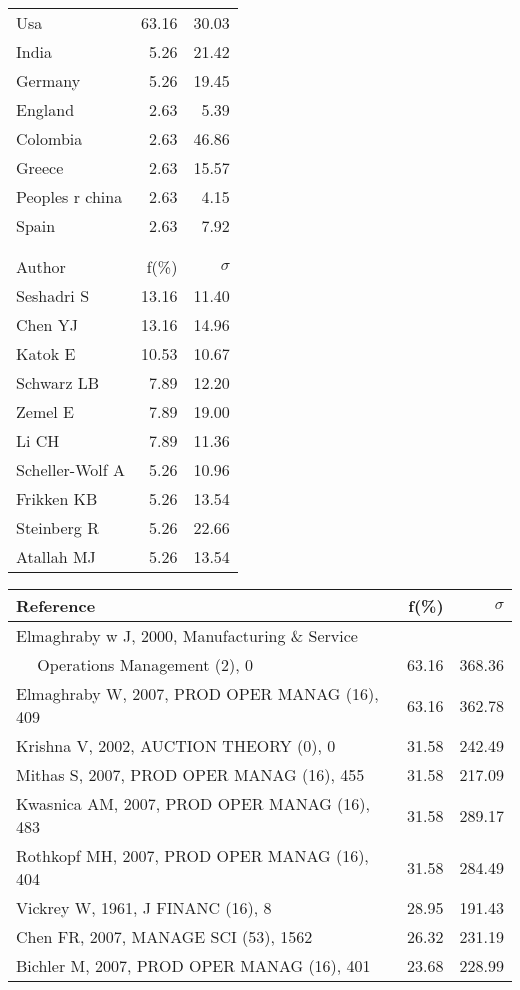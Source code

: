 \documentclass[a4paper,11pt]{report}
\begin{document}
\begin{landscape}
\begin{table}[!ht]
{\begin{tabular}{|l r r|}
\hline
Usa & 63.16 & 30.03\\
India & 5.26 & 21.42\\
Germany & 5.26 & 19.45\\
England & 2.63 & 5.39\\
Colombia & 2.63 & 46.86\\
Greece & 2.63 & 15.57\\
Peoples r china & 2.63 & 4.15\\
Spain & 2.63 & 7.92\\
 &  & \\
 &  & \\
\hline
\hline
Author & f(\%) & $\sigma$\\
\hline
Seshadri S & 13.16 & 11.40\\
Chen YJ & 13.16 & 14.96\\
Katok E & 10.53 & 10.67\\
Schwarz LB & 7.89 & 12.20\\
Zemel E & 7.89 & 19.00\\
Li CH & 7.89 & 11.36\\
Scheller-Wolf A & 5.26 & 10.96\\
Frikken KB & 5.26 & 13.54\\
Steinberg R & 5.26 & 22.66\\
Atallah MJ & 5.26 & 13.54\\
\hline
\end{tabular}
}
{\scriptsize\begin{tabular}{|l r r|}
\hline
Reference & f(\%) & $\sigma$\\
\hline
Elmaghraby w J, 2000, Manufacturing \& Service &  & \\
$\quad$ Operations Management (2), 0 & 63.16 & 368.36\\
Elmaghraby W, 2007, PROD OPER MANAG (16), 409 & 63.16 & 362.78\\
Krishna V, 2002, AUCTION THEORY (0), 0 & 31.58 & 242.49\\
Mithas S, 2007, PROD OPER MANAG (16), 455 & 31.58 & 217.09\\
Kwasnica AM, 2007, PROD OPER MANAG (16), 483 & 31.58 & 289.17\\
Rothkopf MH, 2007, PROD OPER MANAG (16), 404 & 31.58 & 284.49\\
Vickrey W, 1961, J FINANC (16), 8 & 28.95 & 191.43\\
Chen FR, 2007, MANAGE SCI (53), 1562 & 26.32 & 231.19\\
Bichler M, 2007, PROD OPER MANAG (16), 401 & 23.68 & 228.99\\

\end{tabular}}
\end{table}
\end{landscape}
\end{document}
